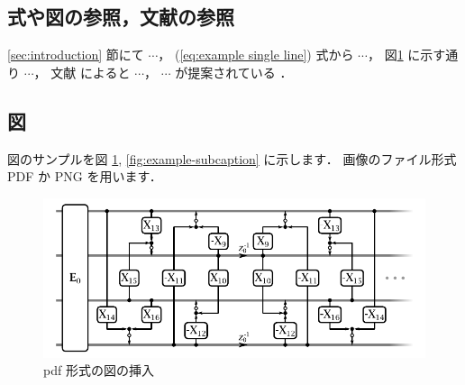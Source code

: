 \documentclass[a4paper,10pt]{ikelab-seminar}
\begin{document}
\subsection{式や図の参照，文献の参照}
\ref{sec:introduction} 節にて $\cdots$，
(\ref{eq:example single line}) 式から $\cdots$，
図\ref{fig:example-pdf} に示す通り $\cdots$，
文献 \cite{Keys1981} によると $\cdots$，
$\cdots$ が提案されている
\cite{Keys1981,Hou1978,Jensen1995,Xin2000,Muresan2004}．

\subsection{図}
図のサンプルを図 \ref{fig:example-pdf}, \ref{fig:example-subcaption} に示します．
画像のファイル形式 PDF か PNG を用います．

\begin{figure}[t]
   \centering
   \includegraphics[width=0.8\hsize]{figure/example-pdf.pdf}
   \caption{pdf 形式の図の挿入}
   \label{fig:example-pdf}
\end{figure}
\end{document}
